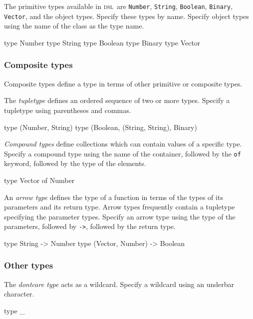 \documentclass[11pt]{article}
\newcommand{\DSL}{{\scshape dsl}}
\newcommand{\literal}[1]{\lstinline[style=DSL,identifierstyle=\itshape]!#1!}
\newcommand{\keyword}[1]{\literal{#1}}
\begin{document}
The primitive types available in \DSL\ are \literal{Number}, \literal{String}, 
\literal{Boolean}, \literal{Binary}, \literal{Vector}, and the object types.
Specify these types by name.
Specify object types using the name of the class as the type name.

\begin{dsl}
type Number
type String
type Boolean
type Binary
type Vector
\end{dsl}

\subsubsection{Composite types}

Composite types define a type in terms of other primitive or composite types.

The \textit{tupletype} defines an ordered sequence of two or more types.
Specify a tupletype using parentheses and commas.

\begin{dsl}
type (Number, String)
type (Boolean, (String, String), Binary)
\end{dsl}

\textit{Compound types} define collections which can contain values of a specific type.
Specify a compound type using the name of the container, followed by the \keyword{of} keyword,
followed by the type of the elements.

\begin{dsl}
type Vector of Number
\end{dsl}

An \textit{arrow type} defines the type of a function in terms of the types of its parameters and its return type.
Arrow types frequently contain a tupletype specifying the parameter types.
Specify an arrow type using the type of the parameters, followed by \keyword{->}, followed by the return type.

\begin{dsl}
type String -> Number
type (Vector, Number) -> Boolean
\end{dsl}

\subsubsection{Other types}

The \textit{dontcare type} acts as a wildcard.
Specify a wildcard using an underbar character.

\begin{dsl}
type _
\end{dsl}
\end{document}

